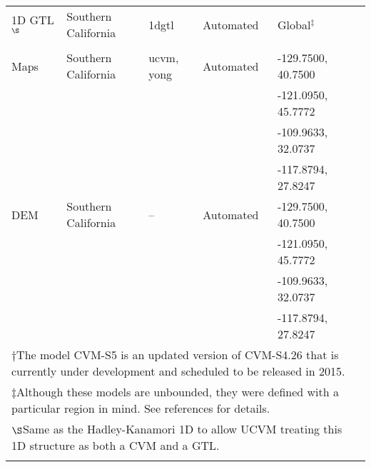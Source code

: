 \begin{table*}
\begin{tabular}[]{llllll}
1D GTL$^\S$        & Southern California   & 1dgtl         &  Automated   & Global$^\ddagger$  & \citet{Kanamori_1975_Chap}   \\
                   &                       &               &              &                    & \citet{Hadley_1977_GSAB}     \\
\hline
\vsthirty{} Maps   & Southern California   & ucvm, yong    &  Automated   & -129.7500, 40.7500 & \citet{Wills_2006_BSSA}      \\
                   &                       &               &              & -121.0950, 45.7772 & \citet{Wald_2007_BSSA}       \\
                   &                       &               &              & -109.9633, 32.0737 & \citet{Yong_2012_BSSA}       \\
                   &                       &               &              & -117.8794, 27.8247 &                              \\
DEM                & Southern California   & --            &  Automated   & -129.7500, 40.7500 & \citet{Gesch_2002_PERS}      \\
                   &                       &               &              & -121.0950, 45.7772 & \citet{Gesch_2007_Chap}      \\
                   &                       &               &              & -109.9633, 32.0737 &                              \\
                   &                       &               &              & -117.8794, 27.8247 &                              \\
\hline
\multicolumn{6}{l}{$\dagger$\quad\footnotesize The model CVM-S5 is an updated version of CVM-S4.26 that is currently under development and scheduled to be released in 2015.}\\
\multicolumn{6}{l}{$\ddagger$\quad\footnotesize Although these models are unbounded, they were defined with a particular region in mind. See references for details.}\\
\multicolumn{6}{l}{$\S$\quad\footnotesize Same as the Hadley-Kanamori 1D to allow UCVM treating this 1D structure as both a CVM and a GTL.}\\
\\
\end{tabular}
\label{tab:cvms}
\end{table*}


